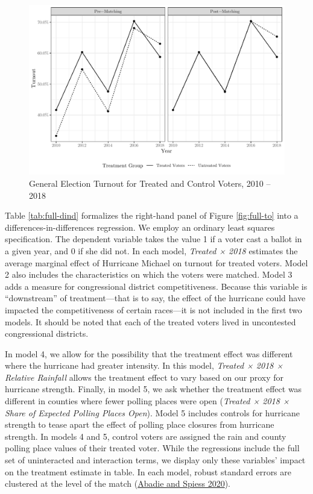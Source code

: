 \documentclass[
  12pt,
]{article}
\begin{document}
\begin{figure}[h]

{\centering \includegraphics{hurricane_michael_files/figure-latex/full-to-chunk-1} 

}

\caption{\label{fig:full-to}General Election Turnout for Treated and Control Voters, 2010 -- 2018}\label{fig:full-to-chunk}
\end{figure}

Table \ref{tab:full-dind} formalizes the right-hand panel of Figure \ref{fig:full-to} into a differences-in-differences regression. We employ an ordinary least squares specification. The dependent variable takes the value 1 if a voter cast a ballot in a given year, and 0 if she did not. In each model, \emph{Treated × 2018} estimates the average marginal effect of Hurricane Michael on turnout for treated voters. Model 2 also includes the characteristics on which the voters were matched. Model 3 adds a measure for congressional district competitiveness. Because this variable is ``downstream'' of treatment---that is to say, the effect of the hurricane could have impacted the competitiveness of certain races---it is not included in the first two models. It should be noted that each of the treated voters lived in uncontested congressional districts.

In model 4, we allow for the possibility that the treatment effect was different where the hurricane had greater intensity. In this model, \emph{Treated × 2018 × Relative Rainfall} allows the treatment effect to vary based on our proxy for hurricane strength. Finally, in model 5, we ask whether the treatment effect was different in counties where fewer polling places were open (\emph{Treated × 2018 × Share of Expected Polling Places Open}). Model 5 includes controls for hurricane strength to tease apart the effect of polling place closures from hurricane strength. In models 4 and 5, control voters are assigned the rain and county polling place values of their treated voter. While the regressions include the full set of uninteracted and interaction terms, we display only these variables' impact on the treatment estimate in table. In each model, robust standard errors are clustered at the level of the match (\protect\hyperlink{ref-Abadie2020}{Abadie and Spiess 2020}).
\end{document}
